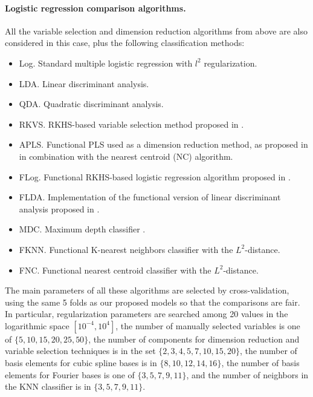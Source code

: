 \paragraph{Logistic regression comparison algorithms.} All the variable selection and dimension reduction algorithms from above are also considered in this case, plus the following classification methods:
\begin{itemize}
  \item Log.\hspace{.3em} Standard multiple logistic regression with \(l^2\) regularization.
  \item LDA.\hspace{.3em} Linear discriminant analysis.
  \item QDA.\hspace{.3em} Quadratic discriminant analysis.
  \item RKVS.\hspace{.3em} RKHS-based variable selection method proposed in \citet{berrendero2018use}.
  \item APLS.\hspace{.3em} Functional PLS used as a dimension reduction method, as proposed in \citet{delaigle2012achieving} in combination with the nearest centroid (NC) algorithm.
  \item FLog.\hspace{.3em} Functional RKHS-based logistic regression algorithm proposed in \citet{berrendero2018functional}.
  \item FLDA.\hspace{.3em} Implementation of the functional version of linear discriminant analysis proposed in \citet{preda2007pls}.
  \item MDC.\hspace{.3em} Maximum depth classifier \citep[e.g.][]{ghosh2005maximum}.
  \item FKNN.\hspace{.3em} Functional K-nearest neighbors classifier with the \(L^2\)-distance.
  \item FNC.\hspace{.3em} Functional nearest centroid classifier with the \(L^2\)-distance.
\end{itemize}

The main parameters of all these algorithms are selected by cross-validation, using the same 5 folds as our proposed models so that the comparisons are fair. In particular, regularization parameters are searched among 20 values in the logarithmic space \([10^{-4}, 10^4]\), the number of manually selected variables is one of \(\{5, 10, 15, 20, 25, 50\}\), the number of components for dimension reduction and variable selection techniques is in the set \(\{2, 3, 4, 5, 7, 10, 15, 20\}\), the number of basis elements for cubic spline bases is in \(\{8,10,12,14,16\}\), the number of basis elements for Fourier bases is one of \(\{3,5,7,9,11\}\), and the number of neighbors in the KNN classifier is in \(\{3,5,7,9,11\}\).

